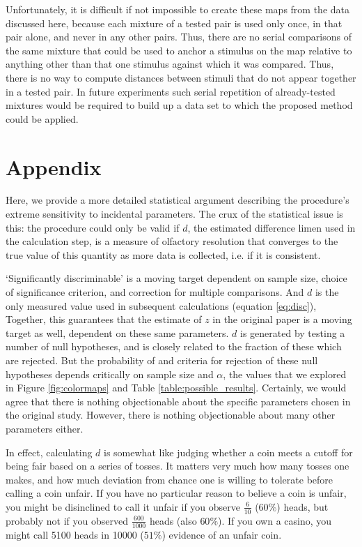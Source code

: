 \documentclass[letterpaper,twocolumn,10pt]{article}
\begin{document}
Unfortunately, it is difficult if not impossible to create these maps from the data discussed here, 
because each mixture of a tested pair is used only once, 
in that pair alone, and never in any other pairs.  
Thus, there are no serial comparisons of the same mixture that could be used to anchor a stimulus on the map 
relative to anything other than that one stimulus against which it was compared.  
Thus, there is no way to compute distances between stimuli that do not appear together in a tested pair.  
In future experiments such serial repetition of already-tested mixtures would be required 
to build up a data set to which the proposed method could be applied.  
\section{Appendix} 

Here, we provide a more detailed statistical argument describing the procedure's extreme sensitivity to incidental parameters. 
The crux of the statistical issue is this: 
the procedure could only be valid if $d$, the estimated difference limen used in the calculation step, 
is a measure of olfactory resolution that converges to the true value of this quantity as more data is collected, 
i.e. if it is consistent. 

`Significantly discriminable' is a moving target dependent on sample size, 
choice of significance criterion, and correction for multiple comparisons. And
 $d$ is the only measured value used in subsequent calculations (equation \ref{eq:disc}), 
Together, this guarantees that the estimate of $z$ in the original paper is a moving target as well, 
dependent on these same parameters.
$d$ is generated by testing a number of null hypotheses, 
and is closely related to the fraction of these which are rejected.  
But the probability of and criteria for rejection of these null hypotheses depends critically on sample size and $\alpha$, the values
that we explored in Figure \ref{fig:colormaps} and Table \ref{table:possible_results}. 
Certainly, we would agree that there is nothing objectionable about the specific parameters chosen in the original study. 
However, there is nothing objectionable about many other parameters either. 

In effect, calculating $d$ is somewhat like judging whether a coin meets a cutoff for being fair based on a series of tosses. 
It matters very much how many tosses one makes, 
and how much deviation from chance one is willing to tolerate before calling a coin unfair. 
If you have no particular reason to believe a coin is unfair, 
you might be disinclined to call it unfair if you observe $\frac{6}{10}$ ($60\%$) heads, 
but probably not if you observed $\frac{600}{1000}$ heads 
(also $60\%$). 
If you own a casino, you might call 5100 heads in 10000 ($51\%$) evidence of an unfair coin. 
\end{document}
